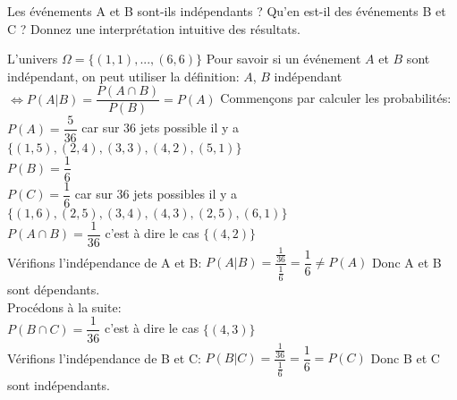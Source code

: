 \begin{exo}
  \begin{subexo}{Les événements A et B sont-ils indépendants ? Qu’en est-il des événements B et C ? Donnez une interprétation intuitive des résultats.}
    \begin{flushleft}
      L'univers $\Omega = \{(1,1),...,(6,6)\}$ Pour savoir si un événement $A$ et $B$ sont indépendant, on peut utiliser la définition: $A$, $B$ indépendant $\Leftrightarrow P(A | B) = \dfrac{P(A \cap B)}{P(B)}=P(A)$ Commençons par calculer les probabilités:
      \\$P(A) = \dfrac{5}{36}$ car sur 36 jets possible il y a $\{(1,5),(2,4),(3,3),(4,2),(5,1)\}$
      \\$P(B) = \dfrac{1}{6}$
      \\$P(C) = \dfrac{1}{6}$ car sur 36 jets possibles il y a $\{(1,6),(2,5),(3,4),(4,3),(2,5),(6,1)\}$
      \\$P(A \cap B) = \dfrac{1}{36}$ c'est à dire le cas $\{(4,2)\}$
      \\Vérifions l'indépendance de A et B: $P(A | B) = \dfrac{\frac{1}{36}}{\frac{1}{6}}=\dfrac{1}{6} \neq P(A)$ Donc A et B sont dépendants.
      \\ Procédons à la suite:
      \\$P(B\cap C) = \dfrac{1}{36}$ c'est à dire le cas $\{(4,3)\}$
      \\Vérifions l'indépendance de B et C: $P(B | C) = \dfrac{\frac{1}{36}}{\frac{1}{6}}=\dfrac{1}{6} = P(C)$ Donc B et C sont indépendants.
    \end{flushleft}
  \end{subexo}
\end{exo}
